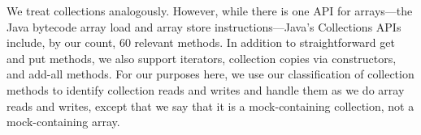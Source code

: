 
We treat collections analogously. However, while there is one API for arrays---the Java bytecode array load and array store instructions---Java's Collections APIs include, by our count, 60 relevant methods. In addition to straightforward get and put methods, we also support iterators, collection copies via constructors, and add-all methods. For our purposes here, we use our classification of collection methods to identify collection reads and writes and handle them as we do array reads and writes, except that we say that it is a mock-containing collection, not a mock-containing array.




